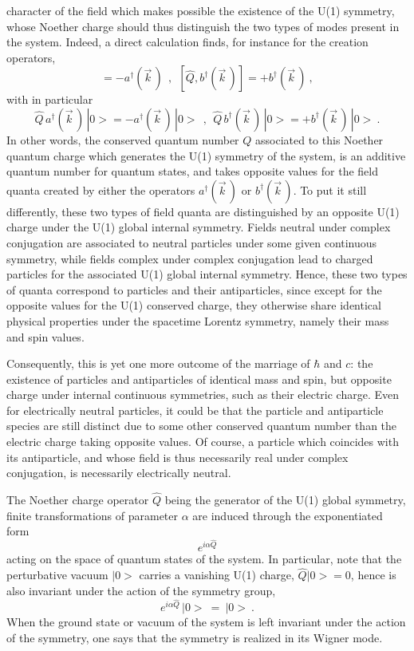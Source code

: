 \documentclass[a4paper,11pt]{article}
\begin{document}
character of the field which makes possible the existence of the U(1)
symmetry, whose Noether charge should thus distinguish the two types of
modes present in the system. Indeed, a direct calculation finds, for
instance for the creation operators,
\begin{equation}
[\hat{Q},a^\dagger(\vec{k}\,)]=-a^\dagger(\vec{k}\,)\ \ ,\ \ 
[\hat{Q},b^\dagger(\vec{k}\,)]=+b^\dagger(\vec{k}\,)\ ,
\end{equation}
with in particular
\begin{equation}
\hat{Q}\,a^\dagger(\vec{k}\,)\,|0>=-a^\dagger(\vec{k}\,)\,|0>\ \ ,\ \ 
\hat{Q}\,b^\dagger(\vec{k}\,)\,|0>=+b^\dagger(\vec{k}\,)\,|0>\ .
\end{equation}
In other words, the conserved quantum number $Q$ associated to this Noether
quantum charge which generates the U(1) symmetry of the system, is an additive
quantum number for quantum states, and takes opposite values for the
field quanta created by either the operators $a^\dagger(\vec{k}\,)$
or $b^\dagger(\vec{k}\,)$. To put it still differently, these two
types of field quanta are distinguished by an opposite U(1) charge
under the U(1) global internal symmetry. Fields neutral under complex
conjugation are associated to neutral particles under some given continuous
symmetry, while fields complex under complex conjugation lead to charged
particles for the associated U(1) global internal symmetry. Hence, these
two types of quanta correspond to particles and their antiparticles, since
except for the opposite values for the U(1) conserved charge, they otherwise
share identical physical properties under the spacetime Lorentz symmetry,
namely their mass and spin values.

Consequently, this is yet one more
outcome of the marriage of $\hbar$ and $c$: the existence of particles and
antiparticles of identical mass and spin, but opposite charge under internal
continuous symmetries, such as their electric charge. Even for electrically
neutral particles, it could be that the particle and antiparticle species
are still distinct due to some other conserved quantum number than the
electric charge taking opposite values. Of course, a particle which coincides
with its antiparticle, and whose field is thus necessarily real under
complex conjugation, is necessarily electrically neutral.

The Noether charge operator $\hat{Q}$ being the generator of the U(1)
global symmetry, finite transformations of parameter $\alpha$ are induced 
through the exponentiated form
\begin{equation}
e^{i\alpha\hat{Q}}
\end{equation}
acting on the space of quantum states of the system. In particular, note
that the perturbative vacuum $|0>$ carries a vanishing U(1) charge,
$\hat{Q}|0>=0$, hence is also invariant under the action of the symmetry
group,
\begin{equation}
e^{i\alpha\hat{Q}}\,|0>\ =\ |0>\ .
\end{equation}
When the ground state or vacuum of the system is left invariant under the
action of the symmetry, one says that the symmetry is realized in its
Wigner mode.
\end{document}

